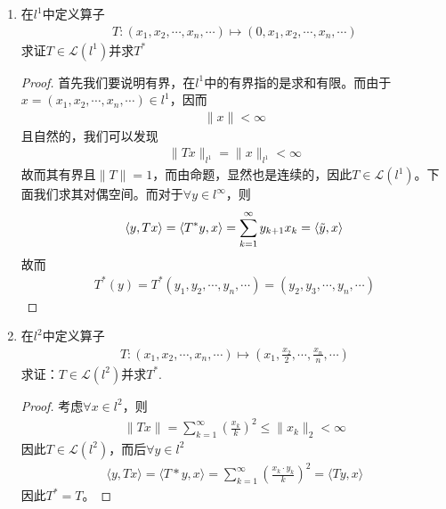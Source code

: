 \begin{enumerate}[leftmargin=2cm, label=\arabic*]
    \item 在$l^1$中定义算子
    \begin{align*}
        T:(x_1,x_2,\cdots,x_n,\cdots) \mapsto (0,x_1,x_2,\cdots,x_n,\cdots)
    \end{align*}
    求证$T\in\mathscr{L}(l^1)$并求$T^*$
    \begin{proof}
        首先我们要说明有界，在$l^1$中的有界指的是求和有限。而由于$x = (x_1,x_2,\cdots,x_n,\cdots)\in l^1$，因而
        \begin{align*}
            \|x\| < \infty
        \end{align*}
        且自然的，我们可以发现
        \begin{align*}
            \|Tx\|_{l^1} = \|x\|_{l^1} < \infty
        \end{align*}
        故而其有界且$\|T\| = 1$，而由命题，显然也是连续的，因此$T\in\mathscr{L}(l^1)$。下面我们求其对偶空间。而对于$\forall y\in l^{\infty}$，则
        \begin{align*}
            \langle y, Tx \rangle = \langle T^*y, x\rangle = \sum\limits_{k=1}^{\infty} y_{k+1} x_k = \langle \Tilde{y}, x \rangle
        \end{align*}
        故而
        \begin{align*}
            T^* (y) = T^*(y_1,y_2,\cdots,y_n,\cdots) = (y_2,y_3,\cdots,y_n,\cdots)
        \end{align*}
    \end{proof}

    \item 在$l^2$中定义算子
    \begin{align*}
        T:(x_1,x_2,\cdots,x_n,\cdots) \mapsto \left(x_1,\frac{x_2}{2},\cdots,\frac{x_n}{n}, \cdots \right)
    \end{align*}
    求证：$T\in\mathscr{L}(l^2)$并求$T^*$.
    \begin{proof}
        考虑$\forall x\in l^2$，则
        \begin{align*}
            \|Tx\| = \sum\limits_{k=1}^{\infty} \left(\frac{x_k}{k}\right)^2 \leqslant \|x_k\|_2 < \infty
        \end{align*}
        因此$T\in\mathscr{L}(l^2)$，而后$\forall y\in l^{2}$
        \begin{align*}
            \langle y, Tx\rangle = \langle T*y, x\rangle = \sum\limits_{k=1}^{\infty} \left(\frac{x_k\cdot y_k}{k}\right)^2 = \langle Ty, x\rangle
        \end{align*}
        因此$T^* = T$。
    \end{proof}


\end{enumerate}
